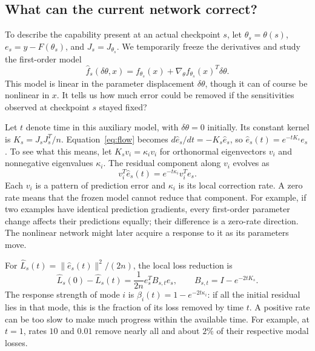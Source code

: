 \documentclass[11pt,a4paper]{article}
\begin{document}
\subsection{What can the current network correct?}

To describe the capability present at an actual checkpoint $s$, let $\theta_s=\theta(s)$, $e_s=y-F(\theta_s)$, and $J_s=J_{\theta_s}$. We temporarily freeze the derivatives and study the first-order model
\begin{equation}
 \widehat f_s(\delta\theta,x)=f_{\theta_s}(x)+\nabla_\theta f_{\theta_s}(x)^T\delta\theta.
 \label{eq:linearization}
\end{equation}
This model is linear in the parameter displacement $\delta\theta$, though it can of course be nonlinear in $x$. It tells us how much error could be removed if the sensitivities observed at checkpoint $s$ stayed fixed?

Let $t$ denote time in this auxiliary model, with $\delta\theta=0$ initially. Its constant kernel is $K_s=J_sJ_s^T/n$. Equation~\eqref{eq:flow} becomes $d\widehat e_s/dt=-K_s\widehat e_s$, so $\widehat e_s(t)=e^{-tK_s}e_s$. To see what this means, let $K_sv_i=\kappa_i v_i$ for orthonormal eigenvectors $v_i$ and nonnegative eigenvalues $\kappa_i$. The residual component along $v_i$ evolves as
\begin{equation}
 v_i^T\widehat e_s(t)=e^{-t\kappa_i}v_i^Te_s.
 \label{eq:modal-decay}
\end{equation}
Each $v_i$ is a pattern of prediction error and $\kappa_i$ is its local correction rate. A zero rate means that the frozen model cannot reduce that component. For example, if two examples have identical prediction gradients, every first-order parameter change affects their predictions equally; their difference is a zero-rate direction. The nonlinear network might later acquire a response to it as its parameters move.

For $\widehat L_s(t)=\|\widehat e_s(t)\|^2/(2n)$, the local loss reduction is
\begin{equation}
 \widehat L_s(0)-\widehat L_s(t)
 =\frac{1}{2n}e_s^T B_{s,t}e_s,\qquad
 B_{s,t}=I-e^{-2tK_s}.
 \label{eq:benefit}
\end{equation}
The response strength of mode $i$ is $\beta_i(t)=1-e^{-2t\kappa_i}$: if all the initial residual lies in that mode, this is the fraction of its loss removed by time $t$. A positive rate can be too slow to make much progress within the available time. For example, at $t=1$, rates $10$ and $0.01$ remove nearly all and about $2\%$ of their respective modal losses.
\end{document}
